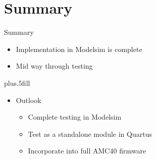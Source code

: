 \documentclass{beamer}
\begin{document}
\section*{Summary}

\begin{frame}{Summary}

  \begin{itemize}
  \item
    Implementation in Modelsim is complete
  \item
    Mid way through testing
  \end{itemize}

  \vskip0pt plus.5fill
  \begin{itemize}
  \item
    Outlook
    \begin{itemize}
    \item
      Complete testing in Modelsim
    \item
      Test as a standalone module in Quartus
    \item
      Incorporate into full AMC40 firmware
    \end{itemize}
  \end{itemize}
\end{frame}
\end{document}
